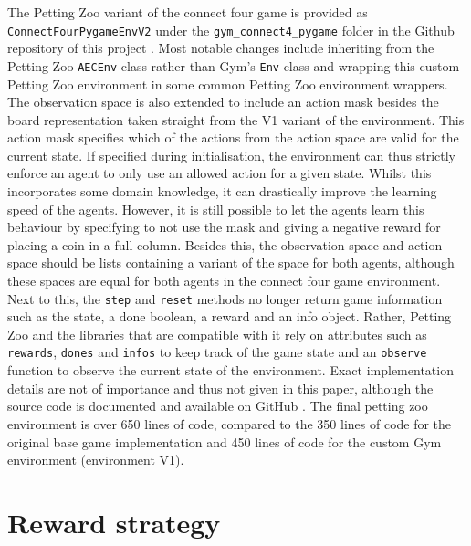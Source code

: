 The Petting Zoo variant of the connect four game is provided as \texttt{ConnectFourPygameEnvV2} under the \texttt{gym\_connect4\_pygame} folder in the Github repository of this project \citep{github_project}.  
Most notable changes include inheriting from the Petting Zoo \texttt{AECEnv} class rather than Gym's \texttt{Env} class and wrapping this custom Petting Zoo environment in some common Petting Zoo environment wrappers. 
The observation space is also extended to include an action mask besides the board representation taken straight from the V1 variant of the environment.
This action mask specifies which of the actions from the action space are valid for the current state.
If specified during initialisation, the environment can thus strictly enforce an agent to only use an allowed action for a given state.
Whilst this incorporates some domain knowledge, it can drastically improve the learning speed of the agents.
However, it is still possible to let the agents learn this behaviour by specifying to not use the mask and giving a negative reward for placing a coin in a full column.
Besides this, the observation space and action space should be lists containing a variant of the space for both agents, although these spaces are equal for both agents in the connect four game environment.
Next to this, the \texttt{step} and \texttt{reset} methods no longer return game information such as the state, a done boolean, a reward and an info object.
Rather, Petting Zoo and the libraries that are compatible with it rely on attributes such as \texttt{rewards}, \texttt{dones} and \texttt{infos} to keep track of the game state and an \texttt{observe} function to observe the current state of the environment.
Exact implementation details are not of importance and thus not given in this paper, although the source code is documented and available on GitHub \citep{github_project}.
The final petting zoo environment is over 650 lines of code, compared to the 350 lines of code for the original base game implementation and 450 lines of code for the custom Gym environment (environment V1).  


\section{Reward strategy}
\label{sec:connect_four_rl-rewards}

